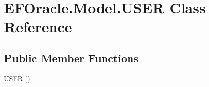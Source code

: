 \hypertarget{class_e_f_oracle_1_1_model_1_1_u_s_e_r}{}\section{E\+F\+Oracle.\+Model.\+U\+S\+ER Class Reference}
\label{class_e_f_oracle_1_1_model_1_1_u_s_e_r}
\subsection*{Public Member Functions}
\begin{DoxyCompactItemize}
\item 
\hyperlink{class_e_f_oracle_1_1_model_1_1_u_s_e_r_a72a8423da1625bbd96ebf3e256e2e69d}{U\+S\+ER} ()
\end{DoxyCompactItemize}
